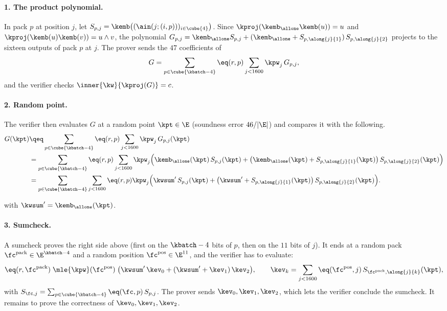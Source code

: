 \paragraph{1. The product polynomial.} In pack $p$ at position $j$, let $S_{p,j}=\kemb\bigl((\ain(j;(i,p)))_{i\in\cube{4}}\bigr)$. Since $\kproj(\kemb_{\allone}\kemb(u))=u$ and $\kproj(\kemb(u)\kemb(v))=u\wedge v$, the polynomial $G_{p,j}=\kemb_{\allone}S_{p,j}+(\kemb_{\allone}+S_{p,\along{j}{1}})\,S_{p,\along{j}{2}}$ projects to the sixteen outputs of pack $p$ at $j$. The prover sends the $47$ coefficients of
\[
G=\sum_{p\in\cube{\kbatch-4}}\eq(r,p)\sum_{j<1600}\kpw_j\,G_{p,j},
\]
and the verifier checks $\inner{\kw}{\kproj(G)}=c$.

\paragraph{2. Random point.} The verifier then evaluates $G$ at a random point $\kpt\in\E$ (soundness error $46/|\E|$) and compares it with the following.
\begin{align*}
G(\kpt)&\qeq\sum_{p\in\cube{\kbatch-4}}\eq(r,p)\sum_{j<1600}\kpw_j\,G_{p,j}(\kpt)\\
&=\sum_{p\in\cube{\kbatch-4}}\eq(r,p)\sum_{j<1600}\kpw_j\Bigl(\kemb_{\allone}(\kpt)\,S_{p,j}(\kpt)+\bigl(\kemb_{\allone}(\kpt)+S_{p,\along{j}{1}}(\kpt)\bigr)\,S_{p,\along{j}{2}}(\kpt)\Bigr)\\
&=\sum_{p\in\cube{\kbatch-4}}\sum_{j<1600}\eq(r,p)\kpw_j\Bigl(\kwsum'\,S_{p,j}(\kpt)+\bigl(\kwsum'+S_{p,\along{j}{1}}(\kpt)\bigr)\,S_{p,\along{j}{2}}(\kpt)\Bigr).
\end{align*}

with $\kwsum'=\kemb_{\allone}(\kpt)$.

\paragraph{3. Sumcheck.} A sumcheck proves the right side above (first on the $\kbatch-4$ bits of $p$, then on the $11$ bits of $j$). It ends at a random pack $\fc^{\mathrm{pack}}\in\E^{\kbatch-4}$ and a random position $\fc^{\mathrm{pos}}\in\E^{11}$, and the verifier has to evaluate:
\[
\eq(r,\fc^{\mathrm{pack}})\;\mle{\kpw}(\fc^{\mathrm{pos}})\;\bigl(\kwsum'\,\kev_0+(\kwsum'+\kev_1)\,\kev_2\bigr),\qquad
\kev_k=\sum_{j<1600}\eq(\fc^{\mathrm{pos}},j)\,S_{\fc^{\mathrm{pack}},\along{j}{k}}(\kpt),
\]
with $S_{\fc,j}=\sum_{p\in\cube{\kbatch-4}}\eq(\fc,p)\,S_{p,j}$. The prover sends $\kev_0,\kev_1,\kev_2$, which lets the verifier conclude the sumcheck. It remains to prove the correctness of $\kev_0,\kev_1,\kev_2$.

